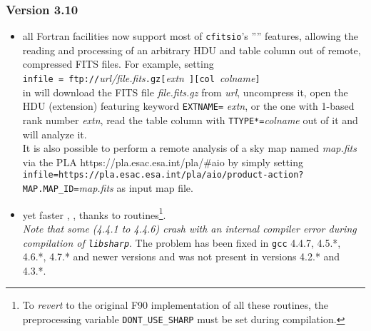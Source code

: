 \documentclass[12pt,twoside]{article}
\newcommand{\compresslist}{%
\setlength{\itemsep}{0ex}}{}
\begin{document}
{\subsubsection{Version 3.10}
\begin{itemize}\compresslist
%
	\item all Fortran facilities now support most of {\tt cfitsio}'s '''' features,
allowing the reading and processing of an arbitrary HDU and table column out of
remote, compressed FITS files. For example, setting \hfill \\
{\tt infile = }{\tt ftp://}{\it url/file.fits}{\tt .gz}{\tt [}{\it extn}{\tt
]}{\tt [col }{\it colname}{\tt ]}  \hfill \\
in 
will download the FITS file {\it file.fits.gz} from {\it url}, 
uncompress it, open the HDU (extension) featuring keyword {\tt EXTNAME=}{\it
extn}, or the one with 1-based rank number {\it extn}, read the table column
with {\tt TTYPE*=}{\it colname} out of it and will analyze it.\\
It is also possible to perform a remote  analysis of a 
sky map named {\it map.fits} via the PLA %
{https://pla.esac.esa.int/pla/\#aio}
by simply setting
{\tt infile=https://pla.esac.esa.int/pla/aio/product-action?MAP.MAP\_ID=}{\it map.fits}
as input map file.
%
	\item yet faster 
,
,
 thanks to  routines\footnote{
To {\em revert} to the original F90 implementation of all these routines, the preprocessing
variable {\tt DONT\_USE\_SHARP} must be set during compilation.}. \\
{\em Note that 
some 
(4.4.1 to 4.4.6) crash with an internal compiler error during compilation of {\tt libsharp}}. 
The problem has been fixed in {\tt gcc} 4.4.7, 4.5.*, 4.6.*, 4.7.* and
newer versions and was not present in versions 4.2.* and 4.3.*.
%
\end{itemize}

}
\end{document}
